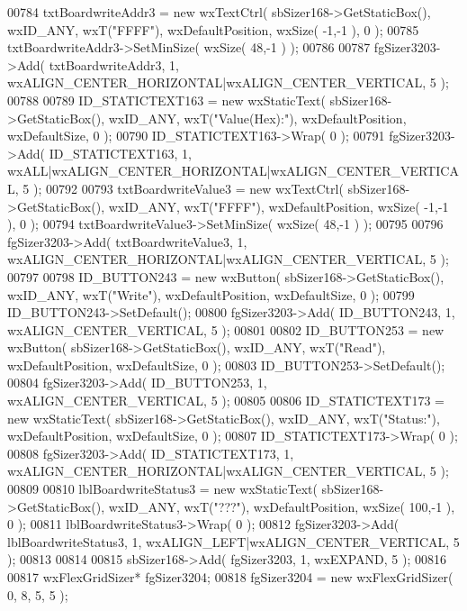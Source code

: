 \begin{DoxyCode}
00784     txtBoardwriteAddr3 = \textcolor{keyword}{new} wxTextCtrl( sbSizer168->GetStaticBox(), wxID\_ANY, wxT(\textcolor{stringliteral}{"FFFF"}), 
      wxDefaultPosition, wxSize( -1,-1 ), 0 );
00785     txtBoardwriteAddr3->SetMinSize( wxSize( 48,-1 ) );
00786     
00787     fgSizer3203->Add( txtBoardwriteAddr3, 1, wxALIGN\_CENTER\_HORIZONTAL|wxALIGN\_CENTER\_VERTICAL, 5 );
00788     
00789     ID_STATICTEXT163 = \textcolor{keyword}{new} wxStaticText( sbSizer168->GetStaticBox(), wxID\_ANY, wxT(\textcolor{stringliteral}{"Value(Hex):"}), 
      wxDefaultPosition, wxDefaultSize, 0 );
00790     ID_STATICTEXT163->Wrap( 0 );
00791     fgSizer3203->Add( ID_STATICTEXT163, 1, wxALL|wxALIGN\_CENTER\_HORIZONTAL|wxALIGN\_CENTER\_VERTICAL, 5 );
00792     
00793     txtBoardwriteValue3 = \textcolor{keyword}{new} wxTextCtrl( sbSizer168->GetStaticBox(), wxID\_ANY, wxT(\textcolor{stringliteral}{"FFFF"}), 
      wxDefaultPosition, wxSize( -1,-1 ), 0 );
00794     txtBoardwriteValue3->SetMinSize( wxSize( 48,-1 ) );
00795     
00796     fgSizer3203->Add( txtBoardwriteValue3, 1, wxALIGN\_CENTER\_HORIZONTAL|wxALIGN\_CENTER\_VERTICAL, 5 );
00797     
00798     ID_BUTTON243 = \textcolor{keyword}{new} wxButton( sbSizer168->GetStaticBox(), wxID\_ANY, wxT(\textcolor{stringliteral}{"Write"}), wxDefaultPosition, 
      wxDefaultSize, 0 );
00799     ID_BUTTON243->SetDefault(); 
00800     fgSizer3203->Add( ID_BUTTON243, 1, wxALIGN\_CENTER\_VERTICAL, 5 );
00801     
00802     ID_BUTTON253 = \textcolor{keyword}{new} wxButton( sbSizer168->GetStaticBox(), wxID\_ANY, wxT(\textcolor{stringliteral}{"Read"}), wxDefaultPosition, 
      wxDefaultSize, 0 );
00803     ID_BUTTON253->SetDefault(); 
00804     fgSizer3203->Add( ID_BUTTON253, 1, wxALIGN\_CENTER\_VERTICAL, 5 );
00805     
00806     ID_STATICTEXT173 = \textcolor{keyword}{new} wxStaticText( sbSizer168->GetStaticBox(), wxID\_ANY, wxT(\textcolor{stringliteral}{"Status:"}), 
      wxDefaultPosition, wxDefaultSize, 0 );
00807     ID_STATICTEXT173->Wrap( 0 );
00808     fgSizer3203->Add( ID_STATICTEXT173, 1, wxALIGN\_CENTER\_HORIZONTAL|wxALIGN\_CENTER\_VERTICAL, 5 );
00809     
00810     lblBoardwriteStatus3 = \textcolor{keyword}{new} wxStaticText( sbSizer168->GetStaticBox(), wxID\_ANY, wxT(\textcolor{stringliteral}{"???"}), 
      wxDefaultPosition, wxSize( 100,-1 ), 0 );
00811     lblBoardwriteStatus3->Wrap( 0 );
00812     fgSizer3203->Add( lblBoardwriteStatus3, 1, wxALIGN\_LEFT|wxALIGN\_CENTER\_VERTICAL, 5 );
00813     
00814     
00815     sbSizer168->Add( fgSizer3203, 1, wxEXPAND, 5 );
00816     
00817     wxFlexGridSizer* fgSizer3204;
00818     fgSizer3204 = \textcolor{keyword}{new} wxFlexGridSizer( 0, 8, 5, 5 );

\end{DoxyCode}
